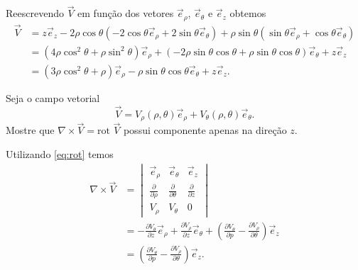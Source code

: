 \documentclass[a4paper,12pt, leqno, answers]{exam}
\newcommand{\devp}[2]{\frac{\partial #1}{\partial #2}}
\begin{document}
\begin{questions}
\begin{solution}
        Reescrevendo $\vec{V}$ em fun\c{c}\~{a}o dos vetores $\vec{e}_\rho$, $\vec{e}_\theta$ e $\vec{e}_z$ obtemos
        \begin{align*}
            \vec{V} &= z \vec{e}_z - 2 \rho \cos \theta \left(-2 \cos \theta \vec{e}_\rho + 2 \sin \theta \vec{e}_\theta\right) + \rho \sin \theta \left(\sin \theta \vec{e}_\rho + \cos \theta \vec{e}_\theta\right) \\
            &= \left(4 \rho \cos^2 \theta + \rho \sin^2 \theta\right) \vec{e}_\rho + \left( -2 \rho \sin \theta \cos \theta + \rho \sin \theta \cos \theta\right) \vec{e}_\theta + z \vec{e}_z \\
            &= \left(3 \rho \cos^2 \theta + \rho\right) \vec{e}_\rho - \rho \sin \theta \cos \theta \vec{e}_\theta + z \vec{e}_z.
        \end{align*}
    \end{solution}
  
    \question Seja o campo vetorial
    \[
    \vec{V} = V_\rho(\rho, \theta) \vec{e}_\rho + V_\theta(\rho, \theta) \vec{e}_\theta.
    \]
    Mostre que $\nabla \times \vec{V} = \mbox{rot } \vec{V}$ possui componente apenas na dire\c{c}\~{a}o $z$.
    \begin{solution}
        Utilizando \eqref{eq:rot} temos
        \begin{align*}
            \nabla \times \vec{V} &= \begin{vmatrix}
                  \vec{e}_\rho & \vec{e}_\theta & \vec{e}_z \\
                  \devp{}{\rho} & \devp{}{\theta} & \devp{}{z} \\
                  V_\rho & V_\theta & 0
            \end{vmatrix} \\
            &= - \devp{V_\theta}{z} \vec{e}_\rho + \devp{V_\rho}{z} \vec{e}_\theta + \left(\devp{V_\theta}{p} - \devp{V_\rho}{\theta}\right) \vec{e}_z \\
            &= \left(\devp{V_\theta}{p} - \devp{V_\rho}{\theta}\right) \vec{e}_z.
        \end{align*}
    \end{solution}
  

\end{questions}
\end{document}
